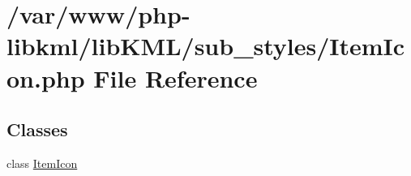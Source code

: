 \hypertarget{ItemIcon_8php}{
\section{/var/www/php-\/libkml/libKML/sub\_\-styles/ItemIcon.php File Reference}
\label{d6/d41/ItemIcon_8php}
}
\subsection*{Classes}
\begin{DoxyCompactItemize}
\item 
class \hyperlink{classItemIcon}{ItemIcon}
\end{DoxyCompactItemize}

